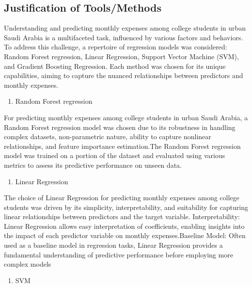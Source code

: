 \documentclass[
]{article}
\providecommand{\tightlist}{%
  \setlength{\itemsep}{0pt}\setlength{\parskip}{0pt}}
\begin{document}
\hypertarget{justification-of-toolsmethods}{%
\subsection{Justification of
Tools/Methods}\label{justification-of-toolsmethods}}

Understanding and predicting monthly expenses among college students in
urban Saudi Arabia is a multifaceted task, influenced by various factors
and behaviors. To address this challenge, a repertoire of regression
models was considered: Random Forest regression, Linear Regression,
Support Vector Machine (SVM), and Gradient Boosting Regression. Each
method was chosen for its unique capabilities, aiming to capture the
nuanced relationships between predictors and monthly expenses.

\begin{enumerate}
\def\labelenumi{\arabic{enumi}.}
\tightlist
\item
  Random Forest regression
\end{enumerate}

For predicting monthly expenses among college students in urban Saudi
Arabia, a Random Forest regression model was chosen due to its
robustness in handling complex datasets, non-parametric nature, ability
to capture nonlinear relationships, and feature importance
estimation.The Random Forest regression model was trained on a portion
of the dataset and evaluated using various metrics to assess its
predictive performance on unseen data.

\begin{enumerate}
\def\labelenumi{\arabic{enumi}.}
\setcounter{enumi}{1}
\tightlist
\item
  Linear Regression
\end{enumerate}

The choice of Linear Regression for predicting monthly expenses among
college students was driven by its simplicity, interpretability, and
suitability for capturing linear relationships between predictors and
the target variable. Interpretability: Linear Regression allows easy
interpretation of coefficients, enabling insights into the impact of
each predictor variable on monthly expenses.Baseline Model: Often used
as a baseline model in regression tasks, Linear Regression provides a
fundamental understanding of predictive performance before employing
more complex models

\begin{enumerate}
\def\labelenumi{\arabic{enumi}.}
\setcounter{enumi}{2}
\tightlist
\item
  SVM
\end{enumerate}
\end{document}
